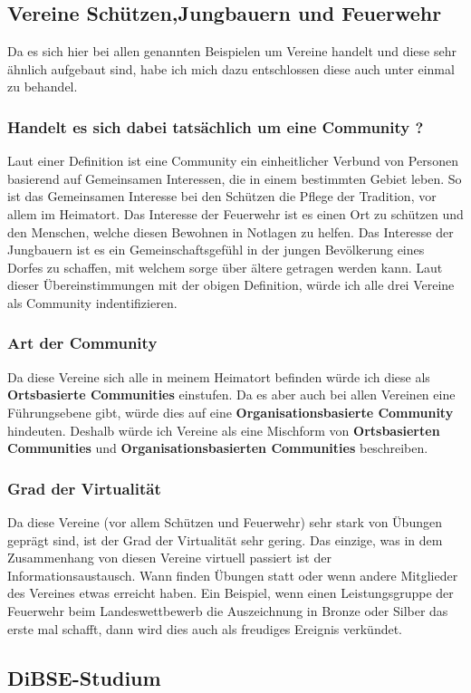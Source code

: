 \documentclass[12pt]{article}
\begin{document}
\subsection{Vereine Schützen,Jungbauern und Feuerwehr}
Da es sich hier bei allen genannten Beispielen um Vereine handelt und diese sehr ähnlich aufgebaut sind, habe ich mich dazu entschlossen diese auch unter einmal zu behandel.
\subsubsection{Handelt es sich dabei tatsächlich um eine Community ?}
Laut einer Definition ist eine Community ein einheitlicher Verbund von Personen basierend auf Gemeinsamen Interessen, die in einem bestimmten Gebiet leben. So ist das Gemeinsamen Interesse bei den Schützen die Pflege der Tradition, vor allem im Heimatort. Das Interesse der Feuerwehr ist es einen Ort zu schützen und den Menschen, welche diesen Bewohnen in Notlagen zu helfen. Das Interesse der Jungbauern ist es ein Gemeinschaftsgefühl in der jungen Bevölkerung eines Dorfes zu schaffen, mit welchem sorge über ältere getragen werden kann. Laut dieser Übereinstimmungen mit der obigen Definition, würde ich alle drei Vereine als Community indentifizieren.
\subsubsection{Art der Community}
Da diese Vereine sich alle in meinem Heimatort befinden würde ich diese als \textbf{Ortsbasierte Communities} einstufen. Da es aber auch bei allen Vereinen eine Führungsebene gibt, würde dies auf eine \textbf{Organisationsbasierte Community} hindeuten. Deshalb würde ich Vereine als eine Mischform von \textbf{Ortsbasierten Communities} und  \textbf{Organisationsbasierten Communities} beschreiben.
\subsubsection{Grad der Virtualität}
Da diese Vereine (vor allem Schützen und Feuerwehr) sehr stark von Übungen geprägt sind, ist der Grad der Virtualität sehr gering. Das einzige, was in dem Zusammenhang von diesen Vereine virtuell passiert ist der Informationsaustausch. Wann finden Übungen statt oder wenn andere Mitglieder des Vereines etwas erreicht haben. Ein Beispiel, wenn einen Leistungsgruppe der Feuerwehr beim Landeswettbewerb die Auszeichnung in Bronze oder Silber das erste mal schafft, dann wird dies auch als freudiges Ereignis verkündet.
\pagebreak
\subsection{DiBSE-Studium}
\end{document}
